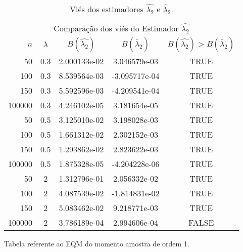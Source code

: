 \documentclass[12pt]{article}
\begin{document}
\begin{table}[H]
\caption{Viés dos estimadores $\hat{\lambda_{2}}$ e $\tilde{\lambda_{2}}$.}
\label{tab:p1Vies}
\centering
\begin{tabular}{rcccc}
\toprule
\multicolumn{5}{c}{Comparação dos viés do Estimador $\hat{\lambda_{2}}$}\\
$n$ & $\lambda$ & $B(\hat{\lambda_{2}})$ & $B(\tilde{\lambda_{2}})$ & $B(\hat{\lambda_{2}})>B(\tilde{\lambda_{2}})$ \\
\midrule
50 & 0.3 & 2.000133e-02 & 3.046579e-03  & TRUE \\
100 & 0.3 & 8.539564e-03 & -3.095717e-04 & TRUE \\
150 & 0.3 & 5.592596e-03 & -4.209541e-04 & TRUE \\
100000 & 0.3 & 4.246102e-05 & 3.181654e-05 & TRUE \\
\midrule
50 & 0.5 & 3.125010e-02 & 3.198028e-03  & TRUE \\
100 & 0.5 &  1.661312e-02 & 2.302152e-03 & TRUE \\
150 & 0.5 &  1.293862e-02  & 2.823622e-03 & TRUE\\
100000 & 0.5 & 1.875328e-05 & -4.204228e-06 & TRUE \\
\midrule
50 & 2 & 1.312796e-01 &  2.056332e-02 & TRUE \\
100 & 2 & 4.087539e-02 & -1.814831e-02 & TRUE \\
150 & 2 & 5.083462e-02 & 9.218771e-03 & TRUE \\
100000 & 2 & 3.786189e-04 & 2.994606e-04 & FALSE \\
\bottomrule
\end{tabular}
\end{table}

Tabela referente ao EQM do momento amostra de ordem 1.
\end{document}
